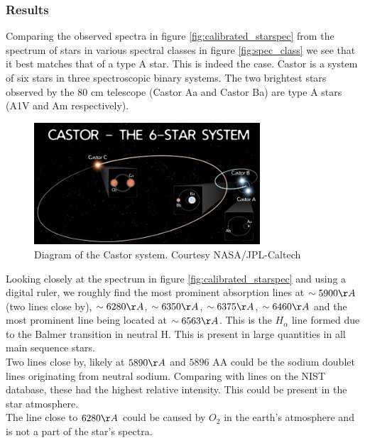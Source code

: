\documentclass[12pt,a4paper]{article}
\begin{document}
    \subsubsection{Results}
      Comparing the observed spectra in figure \ref{fig:calibrated_starspec} from the spectrum of stars in various spectral classes in figure \ref{fig:spec_class} we see that it best matches that of a 
      type A star. This is indeed the case. Castor is a system of six stars in three spectroscopic binary systems. The two brightest stars observed by the 80 cm telescope (Castor Aa and Castor Ba) are type A stars (A1V and Am respectively).\cite{Wikipedia_contributors_2025}\cite{Pourbaix_Tokovinin_Batten_Fekel_Hartkopf_Levato_Morrell_Torres_Udry_2004}
      \begin{figure}[H]
        \centering
        \includegraphics[width=0.75\textwidth]{Pictures/Castor.png}
        \caption{Diagram of the Castor system. Courtesy NASA/JPL-Caltech\cite{Wikipedia_contributors_2025}\cite{Castor}}
        \label{fig:comparison}
      \end{figure}

      Looking closely at the spectrum in figure \ref{fig:calibrated_starspec} and using a digital ruler, we roughly find the most prominent absorption lines at $\sim 5900 \AA$(two lines close by), $\sim 6280 \AA$, $\sim 6350 \AA$, $\sim 6375 \AA$, $\sim 6460 \AA$ and the most prominent line 
      being located at $\sim 6563 \AA$. This is the $H_\alpha$ line formed due to the Balmer transition in neutral H. This is present in large quantities in all main sequence stars.\\
      Two lines close by, likely at $5890 \AA$ and $5896$ AA could be the sodium doublet lines originating from neutral sodium. Comparing with lines on the NIST database, these had the highest relative intensity.\cite{NIST_ASD} This could be present in the star atmosphere. \\
      The line close to $6280 \AA$ could be caused by $O_2$ in the earth's atmosphere and is not a part of the star's spectra. \\
\end{document}
